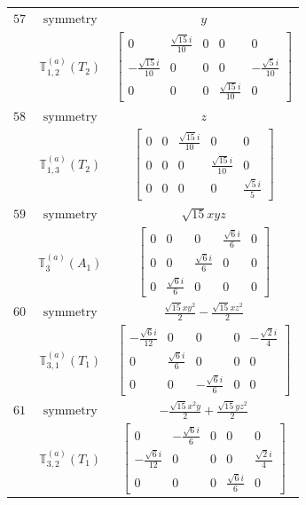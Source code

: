 \documentclass[fleqn,8pt,landscape]{jsarticle}
\begin{document}
\begin{longtable}{ccc}
$ 57 $ & $ \text{symmetry} $ & $ y $ \\
$  $ & $ \mathbb{T}_{1,2}^{(a)}(T_{2}) $ & $ \begin{bmatrix} 0 & \frac{\sqrt{15} i}{10} & 0 & 0 & 0 \\ - \frac{\sqrt{15} i}{10} & 0 & 0 & 0 & - \frac{\sqrt{5} i}{10} \\ 0 & 0 & 0 & \frac{\sqrt{15} i}{10} & 0 \end{bmatrix} $ \\ \hline
$ 58 $ & $ \text{symmetry} $ & $ z $ \\
$  $ & $ \mathbb{T}_{1,3}^{(a)}(T_{2}) $ & $ \begin{bmatrix} 0 & 0 & \frac{\sqrt{15} i}{10} & 0 & 0 \\ 0 & 0 & 0 & \frac{\sqrt{15} i}{10} & 0 \\ 0 & 0 & 0 & 0 & \frac{\sqrt{5} i}{5} \end{bmatrix} $ \\ \hline
$ 59 $ & $ \text{symmetry} $ & $ \sqrt{15} x y z $ \\
$  $ & $ \mathbb{T}_{3}^{(a)}(A_{1}) $ & $ \begin{bmatrix} 0 & 0 & 0 & \frac{\sqrt{6} i}{6} & 0 \\ 0 & 0 & \frac{\sqrt{6} i}{6} & 0 & 0 \\ 0 & \frac{\sqrt{6} i}{6} & 0 & 0 & 0 \end{bmatrix} $ \\ \hline
$ 60 $ & $ \text{symmetry} $ & $ \frac{\sqrt{15} x y^{2}}{2} - \frac{\sqrt{15} x z^{2}}{2} $ \\
$  $ & $ \mathbb{T}_{3,1}^{(a)}(T_{1}) $ & $ \begin{bmatrix} - \frac{\sqrt{6} i}{12} & 0 & 0 & 0 & - \frac{\sqrt{2} i}{4} \\ 0 & \frac{\sqrt{6} i}{6} & 0 & 0 & 0 \\ 0 & 0 & - \frac{\sqrt{6} i}{6} & 0 & 0 \end{bmatrix} $ \\ \hline
$ 61 $ & $ \text{symmetry} $ & $ - \frac{\sqrt{15} x^{2} y}{2} + \frac{\sqrt{15} y z^{2}}{2} $ \\
$  $ & $ \mathbb{T}_{3,2}^{(a)}(T_{1}) $ & $ \begin{bmatrix} 0 & - \frac{\sqrt{6} i}{6} & 0 & 0 & 0 \\ - \frac{\sqrt{6} i}{12} & 0 & 0 & 0 & \frac{\sqrt{2} i}{4} \\ 0 & 0 & 0 & \frac{\sqrt{6} i}{6} & 0 \end{bmatrix} $ \\ \hline

\end{longtable}
\end{document}
